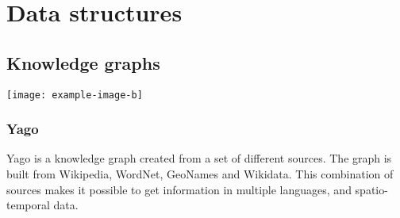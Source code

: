 
\chapter{Data structures}

\section{Knowledge graphs}


\texttt{[image: example-image-b]}

\subsection{Yago}
Yago\cite{yago} is a knowledge graph created from a set of different sources. The graph is built from Wikipedia, WordNet, GeoNames and Wikidata. This combination of sources makes it possible to get information in multiple languages, and spatio-temporal data.

\clearpage
